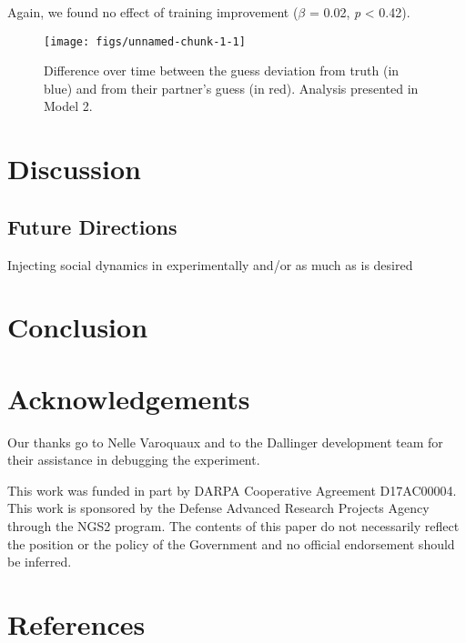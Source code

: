 \documentclass[10pt, letterpaper]{article}
\newenvironment{CodeChunk}{}{}
\begin{document}
Again, we found no effect of training improvement (\emph{\(\beta\)} =
0.02, \emph{p} \textless{} 0.42).

\begin{CodeChunk}
\begin{figure}[H]

\texttt{[image: figs/unnamed-chunk-1-1]} \hfill{}

\caption[Difference over time between the guess deviation from truth (in blue) and from their partner's guess (in red)]{Difference over time between the guess deviation from truth (in blue) and from their partner's guess (in red). Analysis presented in Model 2.}\label{fig:unnamed-chunk-1}
\end{figure}
\end{CodeChunk}

\section{Discussion}\label{discussion}

\subsection{Future Directions}\label{future-directions}

Injecting social dynamics in experimentally and/or as much as is desired

\section{Conclusion}\label{conclusion}

\section{Acknowledgements}\label{acknowledgements}

Our thanks go to Nelle Varoquaux and to the Dallinger development team
for their assistance in debugging the experiment.

This work was funded in part by DARPA Cooperative Agreement D17AC00004.
This work is sponsored by the Defense Advanced Research Projects Agency
through the NGS2 program. The contents of this paper do not necessarily
reflect the position or the policy of the Government and no official
endorsement should be inferred.

\section{References}\label{references}
\end{document}
